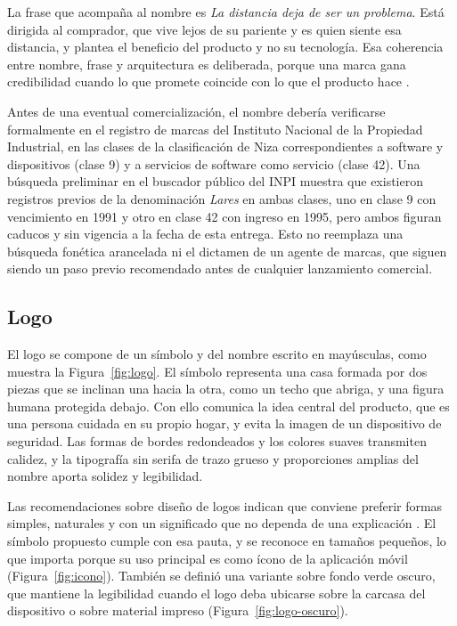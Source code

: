 La frase que acompaña al nombre es \emph{La distancia deja de ser un problema}.
Está dirigida al comprador, que vive lejos de su pariente y es quien siente esa distancia, y plantea el beneficio del producto y no su tecnología.
Esa coherencia entre nombre, frase y arquitectura es deliberada, porque una marca gana credibilidad cuando lo que promete coincide con lo que el producto hace \parencite{Keller2013}.

Antes de una eventual comercialización, el nombre debería verificarse formalmente en el registro de marcas del Instituto Nacional de la Propiedad Industrial, en las clases de la clasificación de Niza correspondientes a software y dispositivos (clase 9) y a servicios de software como servicio (clase 42).
Una búsqueda preliminar en el buscador público del INPI muestra que existieron registros previos de la denominación \emph{Lares} en ambas clases, uno en clase 9 con vencimiento en 1991 y otro en clase 42 con ingreso en 1995, pero ambos figuran caducos y sin vigencia a la fecha de esta entrega.
Esto no reemplaza una búsqueda fonética arancelada ni el dictamen de un agente de marcas, que siguen siendo un paso previo recomendado antes de cualquier lanzamiento comercial.

\subsection{Logo}
\label{sec:branding-logo}

El logo se compone de un símbolo y del nombre escrito en mayúsculas, como muestra la Figura~\ref{fig:logo}.
El símbolo representa una casa formada por dos piezas que se inclinan una hacia la otra, como un techo que abriga, y una figura humana protegida debajo.
Con ello comunica la idea central del producto, que es una persona cuidada en su propio hogar, y evita la imagen de un dispositivo de seguridad.
Las formas de bordes redondeados y los colores suaves transmiten calidez, y la tipografía sin serifa de trazo grueso y proporciones amplias del nombre aporta solidez y legibilidad.

Las recomendaciones sobre diseño de logos indican que conviene preferir formas simples, naturales y con un significado que no dependa de una explicación \parencite{Henderson1998}.
El símbolo propuesto cumple con esa pauta, y se reconoce en tamaños pequeños, lo que importa porque su uso principal es como ícono de la aplicación móvil (Figura~\ref{fig:icono}).
También se definió una variante sobre fondo verde oscuro, que mantiene la legibilidad cuando el logo deba ubicarse sobre la carcasa del dispositivo o sobre material impreso (Figura~\ref{fig:logo-oscuro}).

